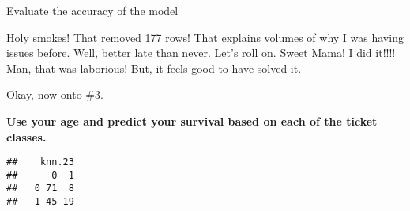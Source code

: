 \documentclass[
  ignorenonframetext,
]{beamer}
\newenvironment{Shaded}{\begin{snugshade}}{\end{snugshade}}
\newcommand{\AttributeTok}[1]{\textcolor[rgb]{0.77,0.63,0.00}{#1}}
\newcommand{\CommentTok}[1]{\textcolor[rgb]{0.56,0.35,0.01}{\textit{#1}}}
\newcommand{\DecValTok}[1]{\textcolor[rgb]{0.00,0.00,0.81}{#1}}
\newcommand{\FloatTok}[1]{\textcolor[rgb]{0.00,0.00,0.81}{#1}}
\newcommand{\FunctionTok}[1]{\textcolor[rgb]{0.00,0.00,0.00}{#1}}
\newcommand{\NormalTok}[1]{#1}
\newcommand{\OtherTok}[1]{\textcolor[rgb]{0.56,0.35,0.01}{#1}}
\newcommand{\SpecialCharTok}[1]{\textcolor[rgb]{0.00,0.00,0.00}{#1}}
\begin{document}
\begin{frame}[fragile]{Evaluate the accuracy of the model}
\begin{block}{Holy smokes! That removed 177 rows! That explains volumes
of why I was having issues before. Well, better late than never. Let's
roll on.}
Sweet Mama! I did it!!!! Man, that was laborious! But, it feels good to
have solved it.

Okay, now onto \#3.
\end{block}

\begin{block}{\textbf{Use your age and predict your survival based on
each of the ticket classes.}}
\protect\hypertarget{use-your-age-and-predict-your-survival-based-on-each-of-the-ticket-classes.}{}
\begin{Shaded}
\end{Shaded}

\begin{verbatim}
##    knn.23
##      0  1
##   0 71  8
##   1 45 19
\end{verbatim}

\begin{Shaded}
\end{Shaded}


\end{block}
\end{frame}
\end{document}
